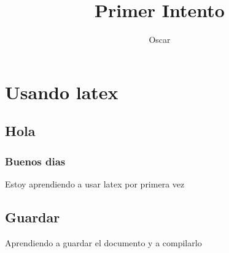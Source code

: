 \documentclass{book}
\title { Primer Intento }
\author { Oscar }
\begin{document}
\maketitle
\tableofcontents

\part { Usando latex }
\chapter{ Hola }
\section { Buenos dias }
Estoy aprendiendo a usar latex por primera vez

\chapter{ Guardar }
Aprendiendo a guardar el documento y a compilarlo
\end{document}
